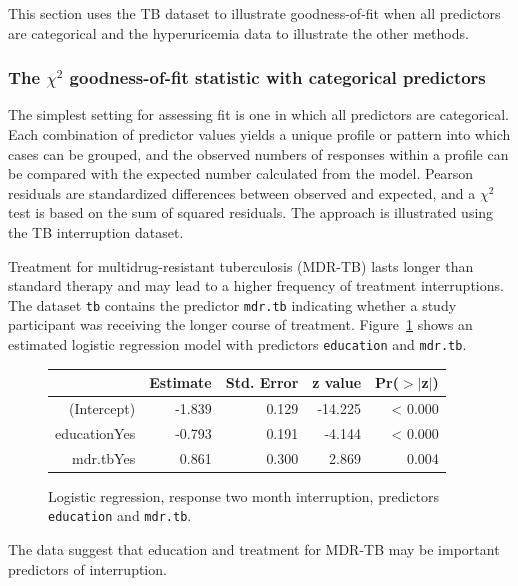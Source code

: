 This section uses the TB dataset to illustrate goodness-of-fit when all predictors are categorical and the hyperuricemia data to illustrate the other methods.

\subsubsection{The $\chi^2$ goodness-of-fit statistic with categorical predictors}

The simplest setting for assessing fit is one in which all predictors are categorical.  Each combination of predictor values yields a unique profile or pattern into which cases can be grouped, and the observed numbers of responses within a profile can be compared with the expected number calculated from the model.  Pearson residuals are standardized differences between observed and expected, and a $\chi^2$ test is based on the sum of squared residuals.  The approach is illustrated using the TB interruption dataset.

Treatment for multidrug-resistant tuberculosis (MDR-TB) lasts longer than standard therapy and may lead to a higher frequency of treatment interruptions.  The dataset \texttt{tb} contains the predictor \texttt{mdr.tb} indicating whether a study participant was receiving the longer course of treatment.  Figure~\ref{treatmentInterruptEducMdrLogreg} shows an estimated logistic regression model with predictors \texttt{education} and \texttt{mdr.tb}.

\begin{figure}[ht]
\centering
\begin{tabular}{rrrrr}
  \hline
 & Estimate & Std. Error & z value & Pr($>$$|$z$|$) \\
  \hline
(Intercept) & -1.839 & 0.129 & -14.225 & < 0.000 \\
  educationYes & -0.793 & 0.191 & -4.144 & < 0.000 \\
  mdr.tbYes & 0.861 & 0.300 & 2.869 & 0.004 \\
   \hline
\end{tabular}
\caption{Logistic regression, response two month interruption,
       predictors \texttt{education} and \texttt{mdr.tb}.}
\label{treatmentInterruptEducMdrLogreg}
\end{figure}
The data suggest that education and treatment for MDR-TB may be important predictors of interruption.

